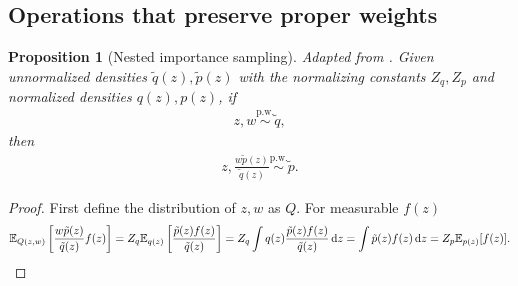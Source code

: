 \documentclass{article}
\newtheorem{proposition}{Proposition}
\theoremstyle{definition}
\newcommand{\pw}{\overset{\text{p.w.}}{\sim}
}
\begin{document}
\subsection{Operations that preserve proper weights}


\begin{proposition}[Nested importance sampling]
    Adapted from \cite[Algorithm 1]{naesseth2015nested}.
    Given unnormalized densities $\tilde q(z), \tilde p(z)$ with the normalizing constants $Z_q, Z_p$ and normalized densities $q(z), p(z)$, if 
    \begin{align}
        z, w \pw \tilde q, \label{eq:1}
    \end{align}
    then
    \begin{align*}
        z, \frac{w\tilde p(z)}{\tilde q(z)} \pw \tilde p.
    \end{align*}
\end{proposition}
\begin{proof}
    First define the distribution of $z, w$ as $Q$.
    For measurable $f(z)$
    \begin{align*}
        \mathbb{E}_{Q(z, w)}\left[\frac{w\tilde p(z)}{\tilde q(z)} f(z)\right] 
        = Z_q \mathbb{E}_{q(z)}\left[\frac{\tilde p(z) f(z)}{\tilde q(z)}\right]
        = Z_q \int q(z) \frac{\tilde p(z) f(z)}{\tilde q(z)} \,\mathrm dz
        = \int \tilde p\textbf{}(z) f(z) \,\mathrm dz
        = Z_p \mathbb{E}_{p(z)}[f(z)].
    \end{align*}
\end{proof}
\end{document}

